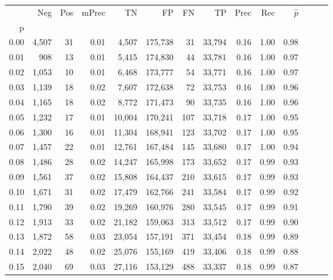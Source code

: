 \begin{tabular}{rrrrrrrrrrrrrr}
\toprule
{} &    Neg &    Pos & mPrec &       TN &       FP &      FN &      TP &  Prec &   Rec & $\hat{p}$ \\
p    &        &        &       &          &          &         &         &       &       &           \\
\midrule
0.00 &  4,507 &     31 &  0.01 &    4,507 &  175,738 &      31 &  33,794 &  0.16 &  1.00 &      0.98 \\
0.01 &    908 &     13 &  0.01 &    5,415 &  174,830 &      44 &  33,781 &  0.16 &  1.00 &      0.97 \\
0.02 &  1,053 &     10 &  0.01 &    6,468 &  173,777 &      54 &  33,771 &  0.16 &  1.00 &      0.97 \\
0.03 &  1,139 &     18 &  0.02 &    7,607 &  172,638 &      72 &  33,753 &  0.16 &  1.00 &      0.96 \\
0.04 &  1,165 &     18 &  0.02 &    8,772 &  171,473 &      90 &  33,735 &  0.16 &  1.00 &      0.96 \\
0.05 &  1,232 &     17 &  0.01 &   10,004 &  170,241 &     107 &  33,718 &  0.17 &  1.00 &      0.95 \\
0.06 &  1,300 &     16 &  0.01 &   11,304 &  168,941 &     123 &  33,702 &  0.17 &  1.00 &      0.95 \\
0.07 &  1,457 &     22 &  0.01 &   12,761 &  167,484 &     145 &  33,680 &  0.17 &  1.00 &      0.94 \\
0.08 &  1,486 &     28 &  0.02 &   14,247 &  165,998 &     173 &  33,652 &  0.17 &  0.99 &      0.93 \\
0.09 &  1,561 &     37 &  0.02 &   15,808 &  164,437 &     210 &  33,615 &  0.17 &  0.99 &      0.93 \\
0.10 &  1,671 &     31 &  0.02 &   17,479 &  162,766 &     241 &  33,584 &  0.17 &  0.99 &      0.92 \\
0.11 &  1,790 &     39 &  0.02 &   19,269 &  160,976 &     280 &  33,545 &  0.17 &  0.99 &      0.91 \\
0.12 &  1,913 &     33 &  0.02 &   21,182 &  159,063 &     313 &  33,512 &  0.17 &  0.99 &      0.90 \\
0.13 &  1,872 &     58 &  0.03 &   23,054 &  157,191 &     371 &  33,454 &  0.18 &  0.99 &      0.89 \\
0.14 &  2,022 &     48 &  0.02 &   25,076 &  155,169 &     419 &  33,406 &  0.18 &  0.99 &      0.88 \\
0.15 &  2,040 &     69 &  0.03 &   27,116 &  153,129 &     488 &  33,337 &  0.18 &  0.99 &      0.87 \\

\end{tabular}
